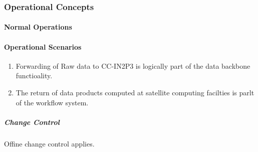 \subsubsection{Operational Concepts}

\paragraph{Normal Operations}


\paragraph{Operational Scenarios}

\begin{enumerate}

\item Forwarding of Raw data to CC-IN2P3 is logically part of the data backbone functioality.

\item The return of data products computed at satellite computing facilties is parlt of the workflow system.

\end{enumerate}

\subparagraph{Change Control}

Offine change control applies.

